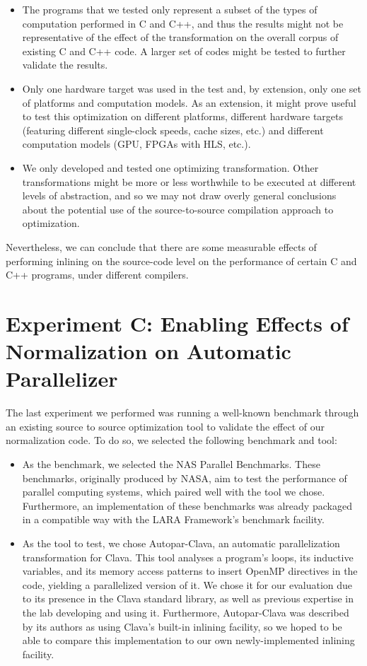 \begin{itemize}
    \item The programs that we tested only represent a subset of the types of computation performed in C and C++, and thus the results might not be representative of the effect of the transformation on the overall corpus of existing C and C++ code. A larger set of codes might be tested to further validate the results.
    \item Only one hardware target was used in the test and, by extension, only one set of platforms and computation models. As an extension, it might prove useful to test this optimization on different platforms, different hardware targets (featuring different single-clock speeds, cache sizes, etc.) and different computation models (GPU, FPGAs with HLS, etc.).
    \item We only developed and tested one optimizing transformation. Other transformations might be more or less worthwhile to be executed at different levels of abstraction, and so we may not draw overly general conclusions about the potential use of the source-to-source compilation approach to optimization.
\end{itemize}

Nevertheless, we can conclude that there are some measurable effects of performing inlining on the source-code level on the performance of certain C and C++ programs, under different compilers.

\section{Experiment C: Enabling Effects of Normalization on Automatic Parallelizer}

The last experiment we performed was running a well-known benchmark through an existing source to source optimization tool to validate the effect of our normalization code. To do so, we selected the following benchmark and tool:

\begin{itemize}
    \item As the benchmark, we selected the NAS Parallel Benchmarks. These benchmarks, originally produced by NASA, aim to test the performance of parallel computing systems, which paired well with the tool we chose. Furthermore, an implementation of these benchmarks was already packaged in a compatible way with the LARA Framework's benchmark facility.
    \item As the tool to test, we chose Autopar-Clava\cite{Arabnejad2018}, an automatic parallelization transformation for Clava. This tool  analyses a program's loops, its inductive variables, and its memory access patterns \cite{Arabnejad2020} to insert OpenMP directives in the code, yielding a parallelized version of it. We chose it for our evaluation due to its presence in the Clava standard library, as well as previous expertise in the lab developing and using it. Furthermore, Autopar-Clava was described by its authors as using Clava's built-in inlining facility, so we hoped to be able to compare this implementation to our own newly-implemented inlining facility.
\end{itemize}

